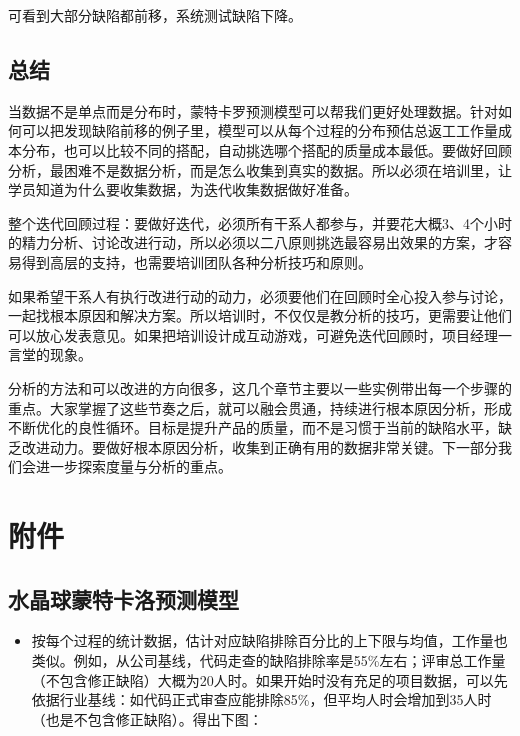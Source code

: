 可看到大部分缺陷都前移，系统测试缺陷下降。

\hypertarget{ux603bux7ed3}{%
\subsection{总结}\label{ux603bux7ed3}}

当数据不是单点而是分布时，蒙特卡罗预测模型可以帮我们更好处理数据。针对如何可以把发现缺陷前移的例子里，模型可以从每个过程的分布预估总返工工作量成本分布，也可以比较不同的搭配，自动挑选哪个搭配的质量成本最低。要做好回顾分析，最困难不是数据分析，而是怎么收集到真实的数据。所以必须在培训里，让学员知道为什么要收集数据，为迭代收集数据做好准备。

整个迭代回顾过程：要做好迭代，必须所有干系人都参与，并要花大概3、4个小时的精力分析、讨论改进行动，所以必须以二八原则挑选最容易出效果的方案，才容易得到高层的支持，也需要培训团队各种分析技巧和原则。

如果希望干系人有执行改进行动的动力，必须要他们在回顾时全心投入参与讨论，一起找根本原因和解决方案。所以培训时，不仅仅是教分析的技巧，更需要让他们可以放心发表意见。如果把培训设计成互动游戏，可避免迭代回顾时，项目经理一言堂的现象。

分析的方法和可以改进的方向很多，这几个章节主要以一些实例带出每一个步骤的重点。大家掌握了这些节奏之后，就可以融会贯通，持续进行根本原因分析，形成不断优化的良性循环。目标是提升产品的质量，而不是习惯于当前的缺陷水平，缺乏改进动力。要做好根本原因分析，收集到正确有用的数据非常关键。下一部分我们会进一步探索度量与分析的重点。

\hypertarget{ux9644ux4ef6}{%
\section{附件}\label{ux9644ux4ef6}}

\hypertarget{ux6c34ux6676ux7403ux8499ux5730ux5361ux7f57ux9884ux6d4bux6a21ux578b}{%
\subsection{水晶球蒙特卡洛预测模型}\label{ux6c34ux6676ux7403ux8499ux5730ux5361ux7f57ux9884ux6d4bux6a21ux578b}}

\begin{itemize}
\tightlist
\item
  按每个过程的统计数据，估计对应缺陷排除百分比的上下限与均值，工作量也类似。例如，从公司基线，代码走查的缺陷排除率是55\%左右；评审总工作量（不包含修正缺陷）大概为20人时。如果开始时没有充足的项目数据，可以先依据行业基线：如代码正式审查应能排除85\%，但平均人时会增加到35人时
  （也是不包含修正缺陷）。得出下图：
\end{itemize}

